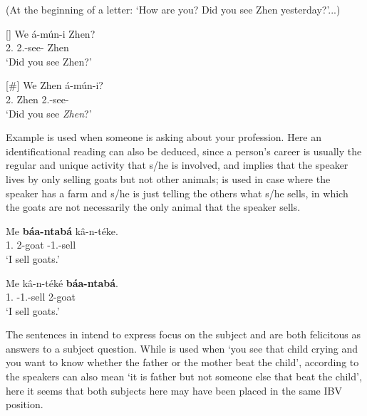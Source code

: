 \documentclass[output=paper,colorlinks,citecolor=brown,
]{langscibook}
\begin{document}
\begin{exe}
    \ex (At the beginning of a letter: `How are you? Did you see Zhen yesterday?'...)\label{76}
    \begin{xlist}
\ex
[]{
\label{76a}
\gll
We á-mún-i Zhen?\\
2\Sg{}.\Pro{} 2\Sg{}.\Pst{}-see-\Pst{} Zhen\\
\trans ‘Did you see Zhen?’
}

\ex
[\#]{
\label{76b}
\gll
We Zhen á-mún-i?\\
2\Sg{}.\Pro{} Zhen 2\Sg{}.\Pst{}-see-\Pst{}\\
\trans ‘Did you see \textit{Zhen}?’ 
}

    \end{xlist}
\end{exe}
Example  is used when someone is asking about your profession. Here an identificational reading can also be deduced, since a person's career is usually the regular and unique activity that s/he is involved, and  implies that the speaker lives by only selling goats but not other animals;  is used in case where the speaker has a farm and s/he is just telling the others what s/he sells, in which the goats are not necessarily the only animal that the speaker sells. 
\begin{exe}
    \ex \label{77}
    \begin{xlist}
\ex
\label{77a}
\gll
Me \textbf{báa-ntabá} kâ-n-téke.\\
1\Sg{}.\Pro{} 2-goat \Prs{}-1\Sg{}.\Sm{}-sell\\
\trans ‘I sell goats.’

\ex
\label{77b}
\gll
Me kâ-n-téké \textbf{báa-ntabá}.\\
1\Sg{}.\Pro{} \Prs{}-1\Sg{}.\Sm{}-sell 2-goat\\
\trans ‘I sell goats.’

    \end{xlist}
\end{exe}
The sentences in  intend to express focus on the subject and are both felicitous as answers to a subject question. While  is used when `you see that child crying and you want to know whether the father or the mother beat the child',  according to the speakers can also mean `it is father but not someone else that beat the child', here it seems that both subjects here may have been placed in the same IBV position.
\end{document}
